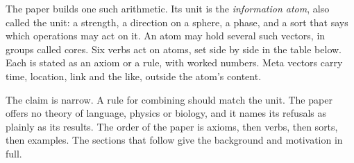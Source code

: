 \documentclass[12pt, a4paper]{article}
\begin{document}
The paper builds one such arithmetic. Its unit is the \emph{information atom}, also called the unit: a strength, a direction on a sphere, a phase, and a sort that says which operations may act on it. An atom may hold several such vectors, in groups called cores. Six verbs act on atoms, set side by side in the table below. Each is stated as an axiom or a rule, with worked numbers. Meta vectors carry time, location, link and the like, outside the atom's content.

The claim is narrow. A rule for combining should match the unit. The paper offers no theory of language, physics or biology, and it names its refusals as plainly as its results. The order of the paper is axioms, then verbs, then sorts, then examples. The sections that follow give the background and motivation in full.
\end{document}

